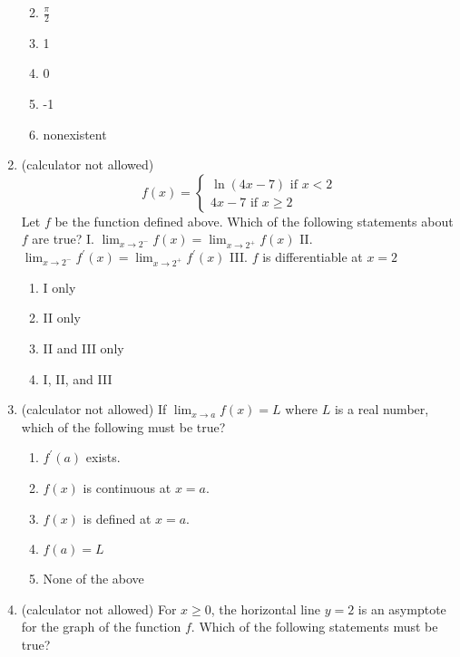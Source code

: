 \documentclass[
]{article}
\providecommand{\tightlist}{%
  \setlength{\itemsep}{0pt}\setlength{\parskip}{0pt}}
\begin{document}
\begin{enumerate}
  \begin{enumerate}
  \def\labelenumii{(\alph{enumii})}
  \tightlist
  \item
    \(\frac{\pi}{2}\)
  \item
    1
  \item
    0
  \item
    -1
  \item
    nonexistent
  \end{enumerate}
\item
  (calculator not allowed) \[f(x)=\left\{\begin{array}{l}
  \ln (4 x-7) \text { if } x<2 \\
  4 x-7 \text { if } x \geq 2
  \end{array}\right.\] Let \(f\) be the function defined above. Which of
  the following statements about \(f\) are true? I.
  \(\lim _{x \rightarrow 2^{-}} f(x)=\lim _{x \rightarrow 2^{+}} f(x)\)
  II.
  \(\lim _{x \rightarrow 2^{-}} f^{\prime}(x)=\lim _{x \rightarrow 2^{+}} f^{\prime}(x)\)
  III. \(f\) is differentiable at \(x=2\)

  \begin{enumerate}
  \def\labelenumii{(\alph{enumii})}
  \tightlist
  \item
    I only
  \item
    II only
  \item
    II and III only
  \item
    I, II, and III
  \end{enumerate}
\item
  (calculator not allowed) If \(\lim _{x \rightarrow a} f(x)=L\) where
  \(L\) is a real number, which of the following must be true?

  \begin{enumerate}
  \def\labelenumii{(\alph{enumii})}
  \tightlist
  \item
    \(f^{\prime}(a)\) exists.
  \item
    \(f(x)\) is continuous at \(x=a\).
  \item
    \(f(x)\) is defined at \(x=a\).
  \item
    \(f(a)=L\)
  \item
    None of the above
  \end{enumerate}
\item
  (calculator not allowed) For \(x \geq 0\), the horizontal line \(y=2\)
  is an asymptote for the graph of the function \(f\). Which of the
  following statements must be true?


\end{enumerate}
\end{document}
